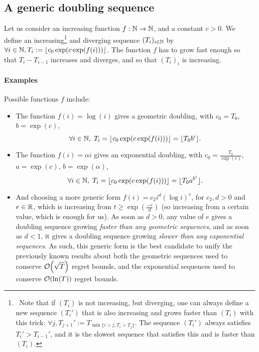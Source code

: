 \documentclass[12pt]{colt2018} %
\begin{document}
\subsection{A generic doubling sequence}

Let us consider an increasing function $f: \mathbb{N} \to \mathbb{N}$, and a constant $c>0$.
We define an increasing\footnote{~Note that if $(T_i)$ is not increasing, but diverging, one can always define a new sequence $(T_i')$ that is also increasing and grows faster than $(T_i)$ with this trick: $\forall j, T_{j+1}' := T_{\min\{i > j, T_i > T_j \}}$. The sequence $(T_i')$ always satisfies $T_i' > T_{i-1}'$, and it is the slowest sequence that satisfies this and is faster than $(T_i)$.}
and diverging sequence $(T_i)_{i\in\mathbb{N}}$ by
$\forall i\in\mathbb{N}, T_i := \lfloor c_0 \exp(c \exp(f(i))) \rfloor$.
The function $f$ has to grow fast enough so that $T_i - T_{i-1}$ increases and diverges, and so that $(T_i)_i$ is increasing.

\paragraph{Examples}
Possible functions $f$ include:
\begin{itemize}
    \item
    The function $f(i) = \log(i)$ gives a geometric doubling,
    with $c_0 = T_0$, $b = \exp(c)$,
    $$\forall i\in\mathbb{N}, \; T_i = \lfloor c_0 \exp(c \exp(f(i))) \rfloor = \lfloor T_0 b^i \rfloor.$$
    \item
    The function $f(i) = \alpha i$ gives an exponential doubling,
    with $c_0 = \frac{T_0}{\exp(c)}$, $a = \exp(c)$, $b = \exp(\alpha)$,
    $$\forall i\in\mathbb{N}, \; T_i = \lfloor c_0 \exp(c \exp(f(i))) \rfloor = \lfloor T_0 a^{b^i} \rfloor.$$
    \item
    And choosing a more generic form $f(i) = c_2 i^d (\log i)^e$, for $c_2,d>0$ and $e\in\mathbb{R}$, which is increasing from $t \geq \exp(\frac{-e}{d})$ (so increasing from a certain value, which is enough for us).
    As soon as $d>0$, any value of $e$ gives a doubling sequence growing \emph{faster than any geometric sequences}, and as soon as $d<1$, it gives a doubling sequence growing \emph{slower than any exponential sequences}.
    As such, this generic form is the best candidate to unify the previously known results about both the geometric sequences used to conserve $\mathop{}\mathopen{}\mathcal{O}\mathopen{}\left(\sqrt{T}\right)$ regret bounds, and the exponential sequences used to conserve $\mathop{}\mathopen{}\mathcal{O}\mathopen{}\left(\ln(T)\right)$ regret bounds.
\end{itemize}
\end{document}
